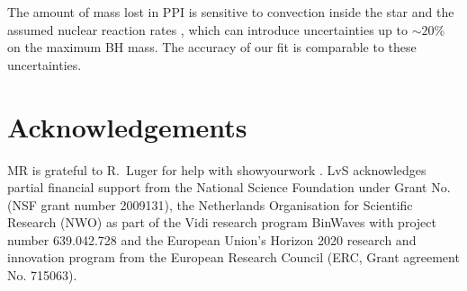 \documentclass[twocolumn]{aastex63}
\begin{document}


The amount of mass lost in PPI is sensitive to convection inside the star
\citep{renzo:20conv} and the assumed nuclear reaction rates \citep{farmer:19,
  farmer:20, costa:21, woosley:21, mehta:21}, which can introduce
  uncertainties up to $\sim{}20\%$ on the maximum BH mass. The accuracy
of our fit is comparable to these uncertainties.

\vspace*{-10pt}
\section*{Acknowledgements}
MR is grateful to R.~Luger for help with showyourwork \citep{luger:21}.
LvS acknowledges partial financial support from the National Science
Foundation under Grant No. (NSF grant number 2009131), the Netherlands
Organisation for Scientific Research (NWO) as part of the Vidi
research program BinWaves with project number 639.042.728 and the
European Union’s Horizon 2020 research and innovation program from the
European Research Council (ERC, Grant agreement No. 715063).


\newpage

\end{document}
